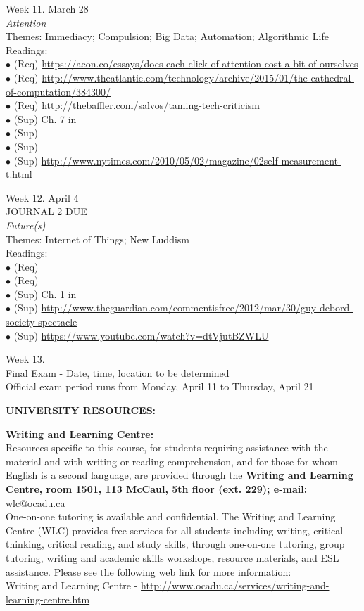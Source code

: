 \documentclass[10pt]{article}
\begin{document}
Week 11. March 28 \\
\textit{Attention} \\
Themes: Immediacy; Compulsion; Big Data; Automation; Algorithmic Life \\
	Readings: \\
	$\bullet$ (Req) \url{https://aeon.co/essays/does-each-click-of-attention-cost-a-bit-of-ourselves}\\
	$\bullet$ (Req) \url{http://www.theatlantic.com/technology/archive/2015/01/the-cathedral-of-computation/384300/}\\
	$\bullet$ (Req) \url{http://thebaffler.com/salvos/taming-tech-criticism}\\
	$\bullet$ (Sup) Ch. 7 in \\
	$\bullet$ (Sup) \\
	$\bullet$ (Sup) \\
	$\bullet$ (Sup) \url{http://www.nytimes.com/2010/05/02/magazine/02self-measurement-t.html}

Week 12. April 4 \\
JOURNAL 2 DUE \\
\textit{Future(s)} \\
Themes: Internet of Things; New Luddism \\
	Readings: \\
	$\bullet$ (Req)  \\
	$\bullet$ (Req) \\
    $\bullet$ (Sup) Ch. 1 in \\
    $\bullet$ (Sup) \url{http://www.theguardian.com/commentisfree/2012/mar/30/guy-debord-society-spectacle}\\
    $\bullet$ (Sup) \url{https://www.youtube.com/watch?v=dtVjutBZWLU}

Week 13. \\
Final Exam - Date, time, location to be determined \\
Official exam period runs from Monday, April 11 to Thursday, April 21     

\textbf{UNIVERSITY RESOURCES:}

\textbf{Writing and Learning Centre:}\\
Resources specific to this course, for students requiring assistance with the material and with writing or reading comprehension, and for those for whom English is a second language, are provided through the \textbf{Writing and Learning Centre, room 1501, 113 McCaul, 5th floor (ext. 229); e-mail:} \href{mailto:wlc@ocadu.ca}{wlc@ocadu.ca}\\  One-on-one tutoring is available and confidential.  The Writing and Learning Centre (WLC) provides free services for all students including writing, critical thinking, critical reading, and study skills, through one-on-one tutoring, group tutoring, writing and academic skills workshops, resource materials, and ESL assistance.  Please see the following web link for more information:\\ Writing and Learning Centre - \url{http://www.ocadu.ca/services/writing-and-learning-centre.htm} 
\end{document}
